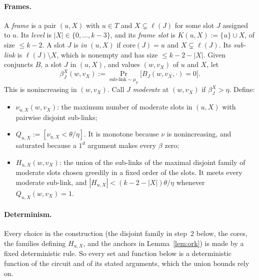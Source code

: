 \documentclass[11pt,a4paper]{article}
\theoremstyle{plain}
\theoremstyle{definition}
\theoremstyle{remark}
\newcommand{\ones}{1^d}
\newcommand{\core}{\mathrm{core}}
\begin{document}
\paragraph{Frames.} A \emph{frame} is a pair $(u,X)$ with $u\in T$ and $X\subsetneq\ell(J)$ for some slot $J$
assigned to $u$. Its \emph{level} is $|X|\in\{0,\dots,k-3\}$, and its \emph{frame slot} is $K(u,X):=\{u\}\cup X$, of
size $\le k-2$. A slot $J$ is \emph{in} $(u,X)$ if $\core(J)=u$ and $X\subsetneq\ell(J)$. Its \emph{sub-link} is
$\ell(J)\setminus X$, which is nonempty and has size $\le k-2-|X|$. Given conjuncts $B$, a slot $J$ in $(u,X)$, and
values $(w,v_X)$ of $u$ and $X$, let
\[
\beta^X_J(w,v_X):=\Pr_{\text{sub-link}\sim\mu_p}\big[B_J(w,v_X,\cdot)=0\big].
\]
This is nonincreasing in $(w,v_X)$. Call $J$ \emph{moderate} at $(w,v_X)$ if $\beta^X_J>\eta$. Define:
\begin{itemize}
  \item $\nu_{u,X}(w,v_X)$: the maximum number of moderate slots in $(u,X)$ with pairwise disjoint sub-links;
  \item $Q_{u,X}:=[\nu_{u,X}<\theta/\eta]$. It is monotone because $\nu$ is nonincreasing, and saturated because a
    $\ones$ argument makes every $\beta$ zero;
  \item $H_{u,X}(w,v_X)$: the union of the sub-links of the maximal disjoint family of moderate slots chosen greedily
    in a fixed order of the slots. It meets every moderate sub-link, and $|H_{u,X}|<(k-2-|X|)\theta/\eta$ whenever
    $Q_{u,X}(w,v_X)=1$.
\end{itemize}
\paragraph{Determinism.} Every choice in the construction (the disjoint family in step~2 below, the cores, the
families defining $H_{u,X}$, and the anchors in Lemma~\ref{lem:ork}) is made by a fixed deterministic rule. So every
set and function below is a deterministic function of the circuit and of its stated arguments, which the union
bounds rely on.
\end{document}
